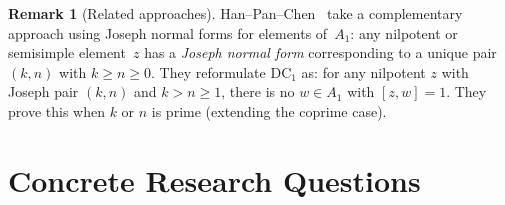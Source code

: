 \documentclass[12pt,a4paper]{article}
\theoremstyle{definition}
\newtheorem{remark}[theorem]{Remark}
\begin{document}
\begin{remark}[Related approaches]
Han--Pan--Chen~\cite{HanPanChen} take a complementary approach using
Joseph normal forms for elements of~$A_1$: any nilpotent or semisimple
element~$z$ has a \emph{Joseph normal form} corresponding to a unique pair
$(k, n)$ with $k \geq n \geq 0$. They reformulate DC$_1$ as: for any nilpotent
$z$ with Joseph pair $(k, n)$ and $k > n \geq 1$, there is no $w \in A_1$
with $[z, w] = 1$.  They prove this when $k$ or $n$ is prime (extending
the coprime case).
\end{remark}

\section{Concrete Research Questions}
\end{document}
